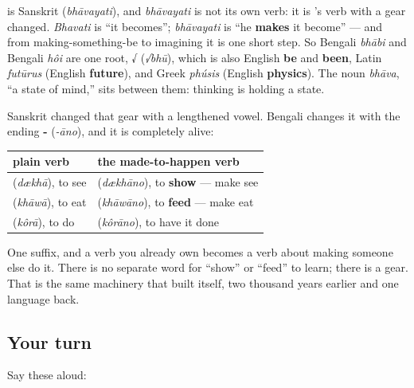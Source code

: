 \begin{cousinweb}
\textbf{} is Sanskrit \textbf{} (\emph{bhāvayati}), and \emph{bhāvayati} is not its own verb: it is \textbf{}'s verb with a gear changed. \emph{Bhavati} is \textquotedblleft{}it becomes\textquotedblright{}; \emph{bhāvayati} is \textquotedblleft{}he \textbf{makes} it become\textquotedblright{} — and from making-something-be to imagining it is one short step. So Bengali \emph{bhābi} and Bengali \emph{hôi} are one root, √ (\emph{√bhū}), which is also English \textbf{be} and \textbf{been}, Latin \emph{futūrus} (English \textbf{future}), and Greek \emph{phúsis} (English \textbf{physics}). The noun \emph{bhāva}, \textquotedblleft{}a state of mind,\textquotedblright{} sits between them: thinking is holding a state.
\end{cousinweb}

\begin{grammarlens}[title={Grammar Lens: the gear that makes someone else do it}]
Sanskrit changed that gear with a lengthened vowel. Bengali changes it with the ending \textbf{-} (\emph{-āno}), and it is completely alive:

\noindent
\begin{tabularx}{\linewidth}{@{}>{\raggedright\arraybackslash}X>{\raggedright\arraybackslash}X@{}}
\toprule
\textbf{plain verb} & \textbf{the made-to-happen verb} \\
\midrule
\bn{দেখা} (\emph{dækhā}), to see & \bn{দেখানো} (\emph{dækhāno}), to \textbf{show} — make see \\
\bn{খাওয়া} (\emph{khāwā}), to eat & \bn{খাওয়ানো} (\emph{khāwāno}), to \textbf{feed} — make eat \\
\bn{করা} (\emph{kôrā}), to do & \bn{করানো} (\emph{kôrāno}), to have it done \\
\bottomrule
\end{tabularx}

One suffix, and a verb you already own becomes a verb about making someone else do it. There is no separate word for \textquotedblleft{}show\textquotedblright{} or \textquotedblleft{}feed\textquotedblright{} to learn; there is a gear. That is the same machinery that built  itself, two thousand years earlier and one language back.
\end{grammarlens}

\subsection*{Your turn}
Say these aloud:

